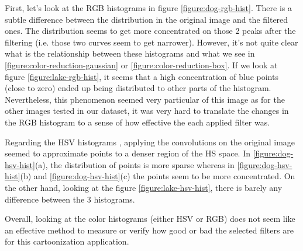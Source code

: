 \documentclass[]{IEEEtran}
\begin{document}
  First, let's look at the RGB histograms in figure \ref{figure:dog-rgb-hist}.
  There is a subtle difference between the distribution in the original
  image and the filtered ones. The distribution seems to get more concentrated on those 2 peaks after the filtering
  (i.e. those two curves seem to get narrower).
  However, it's not quite clear what is the relationship between these histograms and
  what we see in \ref{figure:color-reduction-gaussian} or \ref{figure:color-reduction-box}.
  If we look at figure \ref{figure:lake-rgb-hist}, it seems that a high concentration of blue points (close to zero)
  ended up being distributed to other parts of the histogram. Nevertheless, this phenomenon seemed very
  particular of this image as for the other images tested in our dataset, it was very hard to translate the changes
  in the RGB histogram to a sense of how effective the each applied filter was.

  Regarding the HSV histograms \cite{b7}, applying the convolutions on the original image seemed
  to approximate points to a denser region of the HS space. In \ref{figure:dog-hsv-hist}(a),
  the distribution of points is more sparse whereas in \ref{figure:dog-hsv-hist}(b) and \ref{figure:dog-hsv-hist}(c)
  the points seem to be more concentrated.
  On the other hand, looking at the figure \ref{figure:lake-hsv-hist}, there is barely any difference between the 3 histograms.

  Overall, looking at the color histograms (either HSV or RGB) does not seem like an effective method to
  measure or verify how good or bad the selected filters are for this cartoonization application.
\end{document}
